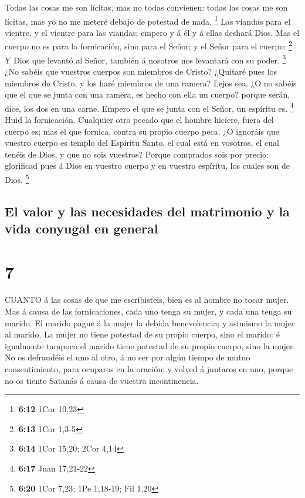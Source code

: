  Todas las cosas me son lícitas, mas no todas convienen:
todas las cosas me son lícitas, mas yo no me meteré debajo de potestad
de nada. \footnote{\textbf{6:12} 1Cor 10,23}  Las viandas
para el vientre, y el vientre para las viandas; empero y á él y á ellas
deshará Dios. Mas el cuerpo no es para la fornicación, sino para el
Señor; y el Señor para el cuerpo: \footnote{\textbf{6:13} 1Cor 1,3-5}
 Y Dios que levantó al Señor, también á nosotros nos
levantará con su poder. \footnote{\textbf{6:14} 1Cor 15,20; 2Cor 4,14}
 ¿No sabéis que vuestros cuerpos son miembros de Cristo?
¿Quitaré pues los miembros de Cristo, y los haré miembros de una ramera?
Lejos sea.  ¿O no sabéis que el que se junta con una
ramera, es hecho con ella un cuerpo? porque serán, dice, los dos en una
carne.  Empero el que se junta con el Señor, un espíritu
es. \footnote{\textbf{6:17} Juan 17,21-22}  Huid la
fornicación. Cualquier otro pecado que el hombre hiciere, fuera del
cuerpo es; mas el que fornica, contra su propio cuerpo peca.
 ¿O ignoráis que vuestro cuerpo es templo del Espíritu
Santo, el cual está en vosotros, el cual tenéis de Dios, y que no sois
vuestros?  Porque comprados sois por precio: glorificad
pues á Dios en vuestro cuerpo y en vuestro espíritu, los cuales son de
Dios. \footnote{\textbf{6:20} 1Cor 7,23; 1Pe 1,18-19; Fil 1,20}

\hypertarget{el-valor-y-las-necesidades-del-matrimonio-y-la-vida-conyugal-en-general}{%
\subsection{El valor y las necesidades del matrimonio y la vida conyugal
en
general}\label{el-valor-y-las-necesidades-del-matrimonio-y-la-vida-conyugal-en-general}}

\hypertarget{section-6}{%
\section{7}\label{section-6}}

 CUANTO á las cosas de que me escribisteis, bien es al
hombre no tocar mujer.  Mas á causa de las fornicaciones,
cada uno tenga su mujer, y cada una tenga su marido.  El
marido pague á la mujer la debida benevolencia; y asimismo la mujer al
marido.  La mujer no tiene potestad de su propio cuerpo,
sino el marido: é igualmente tampoco el marido tiene potestad de su
propio cuerpo, sino la mujer.  No os defraudéis el uno al
otro, á no ser por algún tiempo de mutuo consentimiento, para ocuparos
en la oración: y volved á juntaros en uno, porque no os tiente Satanás á
causa de vuestra incontinencia.


